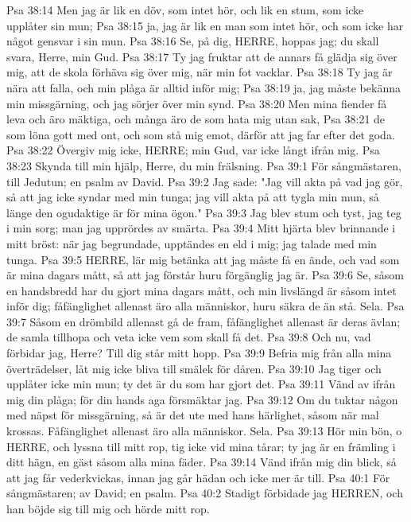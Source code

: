 Psa 38:14  Men jag är lik en döv, som intet hör, och lik en stum, som icke upplåter sin mun;
Psa 38:15  ja, jag är lik en man som intet hör, och som icke har något gensvar i sin mun.
Psa 38:16  Se, på dig, HERRE, hoppas jag; du skall svara, Herre, min Gud.
Psa 38:17  Ty jag fruktar att de annars få glädja sig över mig, att de skola förhäva sig över mig, när min fot vacklar.
Psa 38:18  Ty jag är nära att falla, och min plåga är alltid inför mig;
Psa 38:19  ja, jag måste bekänna min missgärning, och jag sörjer över min synd.
Psa 38:20  Men mina fiender få leva och äro mäktiga, och många äro de som hata mig utan sak,
Psa 38:21  de som löna gott med ont, och som stå mig emot, därför att jag far efter det goda.
Psa 38:22  Övergiv mig icke, HERRE; min Gud, var icke långt ifrån mig.
Psa 38:23  Skynda till min hjälp, Herre, du min frälsning.
Psa 39:1  För sångmästaren, till Jedutun; en psalm av David.
Psa 39:2  Jag sade: "Jag vill akta på vad jag gör, så att jag icke syndar med min tunga; jag vill akta på att tygla min mun, så länge den ogudaktige är för mina ögon."
Psa 39:3  Jag blev stum och tyst, jag teg i min sorg; man jag upprördes av smärta.
Psa 39:4  Mitt hjärta blev brinnande i mitt bröst: när jag begrundade, upptändes en eld i mig; jag talade med min tunga.
Psa 39:5  HERRE, lär mig betänka att jag måste få en ände, och vad som är mina dagars mått, så att jag förstår huru förgänglig jag är.
Psa 39:6  Se, såsom en handsbredd har du gjort mina dagars mått, och min livslängd är såsom intet inför dig; fåfänglighet allenast äro alla människor, huru säkra de än stå. Sela.
Psa 39:7  Såsom en drömbild allenast gå de fram, fåfänglighet allenast är deras ävlan; de samla tillhopa och veta icke vem som skall få det.
Psa 39:8  Och nu, vad förbidar jag, Herre? Till dig står mitt hopp.
Psa 39:9  Befria mig från alla mina överträdelser, låt mig icke bliva till smälek för dåren.
Psa 39:10  Jag tiger och upplåter icke min mun; ty det är du som har gjort det.
Psa 39:11  Vänd av ifrån mig din plåga; för din hands aga försmäktar jag.
Psa 39:12  Om du tuktar någon med näpst för missgärning, så är det ute med hans härlighet, såsom när mal krossas. Fåfänglighet allenast äro alla människor. Sela.
Psa 39:13  Hör min bön, o HERRE, och lyssna till mitt rop, tig icke vid mina tårar; ty jag är en främling i ditt hägn, en gäst såsom alla mina fäder.
Psa 39:14  Vänd ifrån mig din blick, så att jag får vederkvickas, innan jag går hädan och icke mer är till.
Psa 40:1  För sångmästaren; av David; en psalm.
Psa 40:2  Stadigt förbidade jag HERREN, och han böjde sig till mig och hörde mitt rop.
